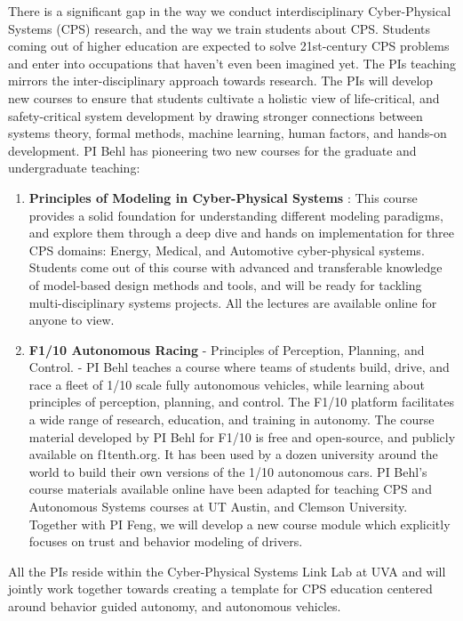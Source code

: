 There is a significant gap in the way we conduct interdisciplinary Cyber-Physical Systems (CPS) research, and the way we train students about CPS. Students coming out of higher education are expected to solve 21st-century CPS problems and enter into occupations that haven’t even been imagined yet. The PIs teaching mirrors the inter-disciplinary approach towards research. 
The PIs will develop new courses to ensure that students cultivate a holistic view of life-critical, and safety-critical system development by drawing stronger connections between systems theory, formal methods, machine learning, human factors, and hands-on development.
PI Behl has pioneering two new courses for the graduate and undergraduate teaching:
\begin{enumerate}
    \item \textbf{Principles of Modeling in Cyber-Physical Systems} : This course provides a solid foundation for understanding different modeling paradigms, and explore them through a deep dive and hands on implementation for three CPS domains: Energy, Medical, and Automotive cyber-physical systems. Students come out of this course with advanced and transferable knowledge of model-based design methods and tools, and will be ready for tackling multi-disciplinary systems projects. All the lectures are available online for anyone to view. 
    \item \textbf{F1/10 Autonomous Racing} - Principles of Perception, Planning, and Control. - PI Behl teaches a course where teams of students build, drive, and race a fleet of 1/10 scale fully autonomous vehicles, while learning about principles of perception, planning, and control. The F1/10 platform facilitates a wide range of research, education, and training in autonomy. The course material developed by PI Behl for F1/10 is free and open-source, and publicly available on f1tenth.org. It has been used by a dozen university around the world to build their own versions of the 1/10 autonomous cars. PI Behl's course materials available online have been adapted for teaching CPS and Autonomous Systems courses at UT Austin, and Clemson University. Together with PI Feng, we will develop a new course module which explicitly focuses on trust and behavior modeling of drivers. 
\end{enumerate}

All the PIs reside within the Cyber-Physical Systems Link Lab at UVA and will jointly work together towards creating a template for CPS education centered around behavior guided autonomy, and autonomous vehicles. 

